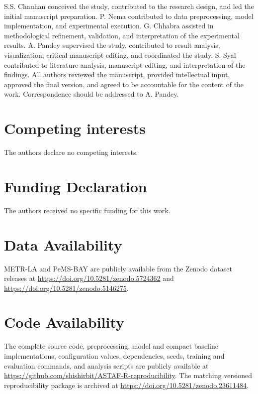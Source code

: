 \documentclass[fleqn,10pt]{wlscirep}
\newenvironment{changedcontent}{\color{changeblue}}{}
\begin{document}
S.S. Chauhan conceived the study, contributed to the research design, and led the initial manuscript preparation. 
P. Nema contributed to data preprocessing, model implementation, and experimental execution. 
G. Chhabra assisted in methodological refinement, validation, and interpretation of the experimental results. 
A. Pandey supervised the study, contributed to result analysis, visualization, critical manuscript editing, and coordinated the study. 
S. Syal contributed to literature analysis, manuscript editing, and interpretation of the findings. 
All authors reviewed the manuscript, provided intellectual input, approved the final version, and agreed to be accountable for the content of the work. 
Correspondence should be addressed to A. Pandey.

\section*{Competing interests}

The authors declare no competing interests.

\section*{Funding Declaration}

The authors received no specific funding for this work.

\section*{Data Availability}
METR-LA and PeMS-BAY are publicly available from the Zenodo dataset releases
at \url{https://doi.org/10.5281/zenodo.5724362} and
\url{https://doi.org/10.5281/zenodo.5146275}.

\section*{Code Availability}
\begin{changedcontent}
The complete source code, preprocessing, model and compact baseline
implementations, configuration values, dependencies, seeds, training and
evaluation commands, and analysis scripts are publicly available at
\url{https://github.com/shishirbit/ASTAF-R-reproducibility}. The matching
versioned reproducibility package is archived at
\url{https://doi.org/10.5281/zenodo.23611484}.
\end{changedcontent}


\end{document}
